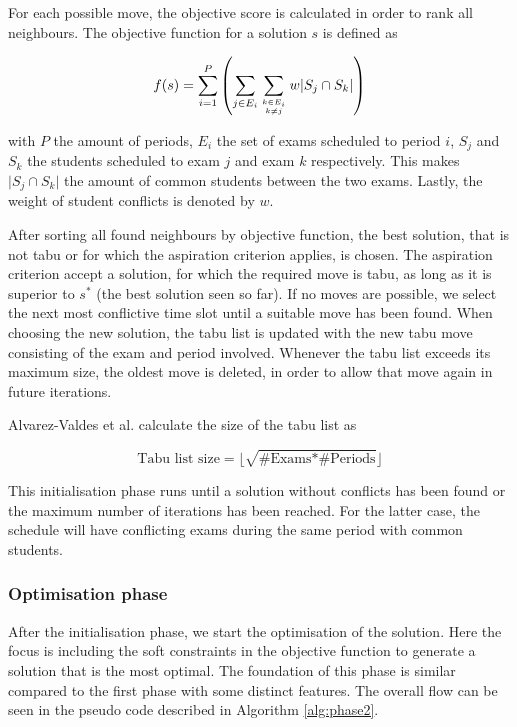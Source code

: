 For each possible move, the objective score is calculated in order to rank all neighbours. The objective function for a solution $s$ is defined as

\begin{equation}
    f(s) = \sum_{i=1}^{P} \left( \sum_{j \in E_i}^{}\sum_{k \in E_i \atop k \neq j}^{}w \lvert S_j \cap S_k \rvert \right)
\end{equation}


with $P$ the amount of periods, $E_i$ the set of exams scheduled to period $i$, $S_j$ and $S_k$ the students scheduled to exam $j$ and exam $k$ respectively. This makes $\lvert S_j \cap S_k \rvert$ the amount of common students between the two exams. Lastly, the weight of student conflicts is denoted by $w$.

After sorting all found neighbours by objective function, the best solution, that is not tabu or for which the aspiration criterion applies, is chosen. The aspiration criterion accept a solution, for which the required move is tabu, as long as it is superior to $s^*$ (the best solution seen so far). If no moves are possible, we select the next most conflictive time slot until a suitable move has been found. When choosing the new solution, the tabu list is updated with the new tabu move consisting of the exam and period involved. Whenever the tabu list exceeds its maximum size, the oldest move is deleted, in order to allow that move again in future iterations.

Alvarez-Valdes et al. calculate the size of the tabu list as

\begin{equation} \label{eq:list}
    \text{Tabu list size} = \lfloor\sqrt{\text{\# Exams} * \text{\# Periods}}\rfloor
\end{equation}

This initialisation phase runs until a solution without conflicts has been found or the maximum number of iterations has been reached. For the latter case, the schedule will have conflicting exams during the same period with common students.

\subsubsection{Optimisation phase}

After the initialisation phase, we start the optimisation of the solution. Here the focus is including the soft constraints in the objective function to generate a solution that is the most optimal. The foundation of this phase is similar compared to the first phase with some distinct features. The overall flow can be seen in the pseudo code described in Algorithm \ref{alg:phase2}.

